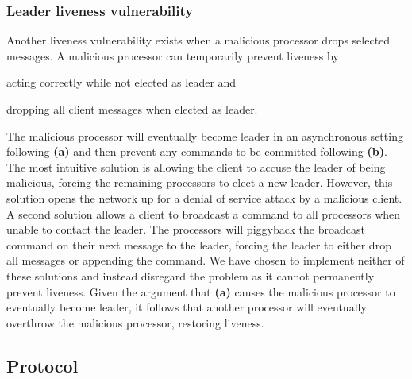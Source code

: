 \documentclass{article}
\begin{document}
	\subsubsection*{Leader liveness vulnerability}
	\label{subsub:leader-liveness-vulnerability}

	Another liveness vulnerability exists when a malicious processor drops selected messages.
	A malicious processor can temporarily prevent liveness by
	\begin{enumerate*}[label=\textbf{(\alph*)}]
	  \item acting correctly while not elected as leader and
	  \item dropping all client messages when elected as leader.
	\end{enumerate*}
	The malicious processor will eventually become leader in an asynchronous setting following \textbf{(a)} and then prevent any commands to be committed following \textbf{(b)}.
	The most intuitive solution is allowing the client to accuse the leader of being malicious, forcing the remaining processors to elect a new leader.
	However, this solution opens the network up for a denial of service attack by a malicious client.
	A second solution allows a client to broadcast a command to all processors when unable to contact the leader.
	The processors will piggyback the broadcast command on their next message to the leader, forcing the leader to either drop all messages or appending the command.
	We have chosen to implement neither of these solutions and instead disregard the problem as it cannot permanently prevent liveness.
	Given the argument that \textbf{(a)} causes the malicious processor to eventually become leader, it follows that another processor will eventually overthrow the malicious processor, restoring liveness.

	\subsection{Protocol}
	\label{subsec:protocol}
\end{document}
